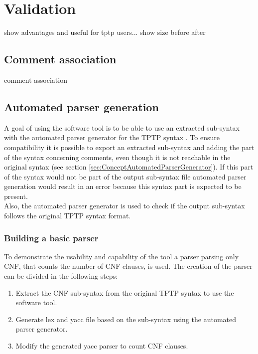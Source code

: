 
\chapter{Validation}\label{sec:Validation}
show advantages and useful for tptp users...
show size before after 
\section{Comment association}\label{sec:ValidationCommentAssociation}
comment association


\section{Automated parser generation}\label{sec:ValidationAutomatedParserGeneration}
A goal of using the software tool is to be able to use an extracted sub-syntax with the automated parser generator for the \ac{TPTP} syntax \cite{VS06}.
To ensure compatibility it is possible to export an extracted sub-syntax and adding the part of the syntax concerning comments, even though it is not reachable in the original syntax (see section \ref{sec:ConceptAutomatedParserGenerator}). If this part of the syntax would not be part of the output sub-syntax file automated parser generation would result in an error because this syntax part is expected to be present.\\
Also, the automated parser generator is used to check if the output sub-syntax follows the original \ac{TPTP} syntax format.

\subsection{Building a basic parser}\label{sec:ValidationAutomatedParserGenerationBuildingBasicParser}
To demonstrate the usability and capability of the tool a parser parsing only \ac{CNF}, that counts the number of \ac{CNF} clauses, is used.
The creation of the parser can be divided in the following steps:
\begin{enumerate}%
	\item Extract the \ac{CNF} sub-syntax from the original \ac{TPTP} syntax to use the software tool.
	\item Generate lex and yacc file based on the sub-syntax using the automated parser generator.
	\item Modify the generated yacc parser to count \ac{CNF} clauses.
\end{enumerate}

